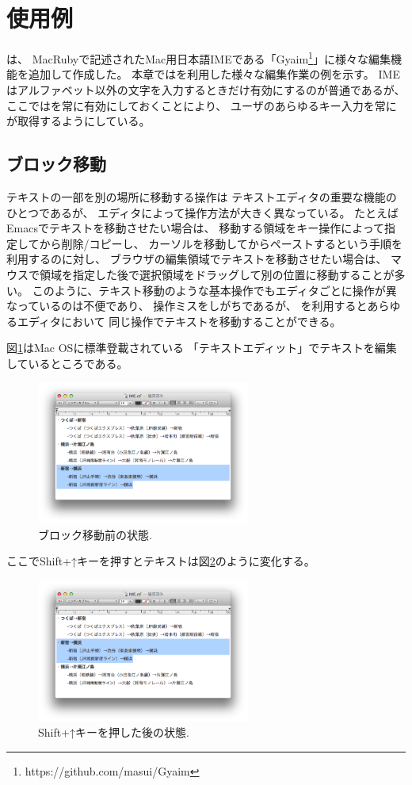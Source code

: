 \section{使用例}

{\system}は、
MacRubyで記述されたMac用日本語IMEである「Gyaim\footnote{
 \textsf{https://github.com/masui/Gyaim}
}」に様々な編集機能を追加して作成した。
%
本章では{\system}を利用した様々な編集作業の例を示す。
IMEはアルファベット以外の文字を入力するときだけ有効にするのが普通であるが、
ここでは{\system}を常に有効にしておくことにより、
ユーザのあらゆるキー入力を常に{\system}が取得するようにしている。

\subsection{ブロック移動}

テキストの一部を別の場所に移動する操作は
テキストエディタの重要な機能のひとつであるが、
エディタによって操作方法が大きく異なっている。
たとえばEmacsでテキストを移動させたい場合は、
移動する領域をキー操作によって指定してから削除/コピーし、
カーソルを移動してからペーストするという手順を利用するのに対し、
ブラウザの編集領域でテキストを移動させたい場合は、
マウスで領域を指定した後で選択領域をドラッグして別の位置に移動することが多い。
このように、テキスト移動のような基本操作でもエディタごとに操作が異なっているのは不便であり、
操作ミスをしがちであるが、
{\system}を利用するとあらゆるエディタにおいて
同じ操作でテキストを移動することができる。

図\ref{move1}はMac OSに標準登載されている
「テキストエディット」でテキストを編集しているところである。

\begin{figure}[H]
\centerline{\includegraphics[width=70mm,bb=0 0 703 472]{figures/block2.png}}
\caption{ブロック移動前の状態.}
\label{move1}
\end{figure}

ここでShift+↑キーを押すとテキストは図\ref{move2}のように変化する。

\begin{figure}[H]
\centerline{\includegraphics[width=70mm,bb=0 0 703 472]{figures/block3.png}}
\caption{Shift+↑キーを押した後の状態.}
\label{move2}
\end{figure}

